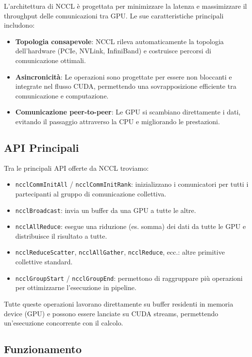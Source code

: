 \documentclass[a4paper]{article}
\begin{document}
L'architettura di NCCL è progettata per minimizzare la latenza e massimizzare il throughput delle comunicazioni tra GPU. Le sue caratteristiche principali includono:

\begin{itemize}
    \item \textbf{Topologia consapevole}: NCCL rileva automaticamente la topologia dell’hardware (PCIe, NVLink, InfiniBand) e costruisce percorsi di comunicazione ottimali.
    \item \textbf{Asincronicità}: Le operazioni sono progettate per essere non bloccanti e integrate nel flusso CUDA, permettendo una sovrapposizione efficiente tra comunicazione e computazione.
    \item \textbf{Comunicazione peer-to-peer}: Le GPU si scambiano direttamente i dati, evitando il passaggio attraverso la CPU e migliorando le prestazioni.
\end{itemize}

\subsection{API Principali}
Tra le principali API offerte da NCCL troviamo:
\begin{itemize}
    \item \texttt{ncclCommInitAll} / \texttt{ncclCommInitRank}: inizializzano i comunicatori per tutti i partecipanti al gruppo di comunicazione collettiva.
    \item \texttt{ncclBroadcast}: invia un buffer da una GPU a tutte le altre.
    \item \texttt{ncclAllReduce}: esegue una riduzione (es. somma) dei dati da tutte le GPU e distribuisce il risultato a tutte.
    \item \texttt{ncclReduceScatter}, \texttt{ncclAllGather}, \texttt{ncclReduce}, ecc.: altre primitive collettive standard.
    \item \texttt{ncclGroupStart} / \texttt{ncclGroupEnd}: permettono di raggruppare più operazioni per ottimizzarne l’esecuzione in pipeline.
\end{itemize}

Tutte queste operazioni lavorano direttamente su buffer residenti in memoria device (GPU) e possono essere lanciate su CUDA streams, permettendo un'esecuzione concorrente con il calcolo.

\subsection{Funzionamento}
\end{document}
